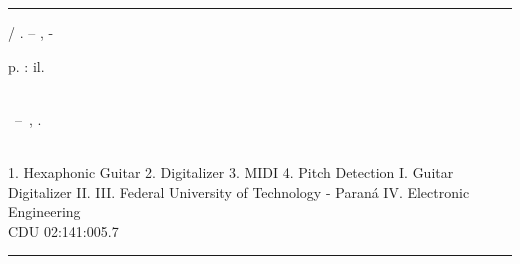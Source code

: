 %     
\begin{catalographiccard}
	\vspace*{\fill}					%
	\hrule							%
	\begin{center}					%
	\begin{minipage}[c]{12.5cm}		%

	\printauthor

	\hspace{0.5cm} \printtitle  / \printauthor. --
	\printlocal, \printdate-

	\hspace{0.5cm} \pageref{LastPage} p. : il.\\

	\hspace{0.5cm} \printadvisorLabel~\printadvisor\\

	\hspace{0.5cm}
	\parbox[t]{\textwidth}{\printtypeofdocument~--~\printinstitution,
	\printdate.}\\

	\hspace{0.5cm}
		1. Hexaphonic Guitar
		2. Digitalizer
		3. MIDI
		4. Pitch Detection
		I. Guitar Digitalizer
		II. \printadvisor
		III. Federal University of Technology - Paraná
		IV. Electronic Engineering\\

	\hspace{8.75cm} CDU 02:141:005.7\\

	\end{minipage}
	\end{center}
	\hrule
\end{catalographiccard}

